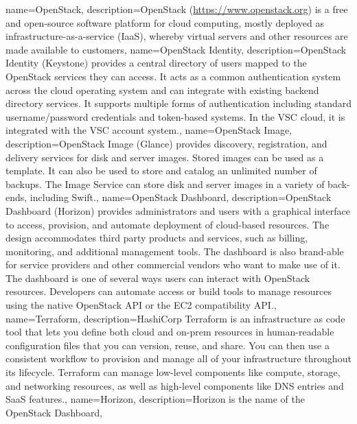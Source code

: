 { name={OpenStack},
  description={OpenStack (\url{https://www.openstack.org}) is a free
    and open-source software platform for cloud computing, mostly
    deployed as infrastructure-as-a-service (IaaS), whereby virtual
    servers and other resources are made available to customers}, }
{ name={OpenStack Identity},
  description={OpenStack Identity (Keystone) provides a central
    directory of users mapped to the OpenStack services they can
    access. It acts as a common authentication system across the cloud
    operating system and can integrate with existing backend directory
    services. It supports multiple forms of authentication including
    standard username/password credentials and token-based systems.
    In the VSC cloud, it is integrated with the VSC account system.},
}
{
  name={OpenStack Image},
  description={OpenStack Image (Glance) provides discovery,
  registration, and delivery services for disk and server images. Stored
  images can be used as a template. It can also be used to store and
  catalog an unlimited number of backups. The Image Service can store
  disk and server images in a variety of back-ends, including Swift.},
}
{
  name={OpenStack Dashboard},
  description={OpenStack Dashboard (Horizon) provides administrators and
  users with a graphical interface to access, provision, and automate
  deployment of cloud-based resources. The design accommodates third
  party products and services, such as billing, monitoring, and
  additional management tools. The dashboard is also brand-able for
  service providers and other commercial vendors who want to make use of
  it. The dashboard is one of several ways users can interact with
  OpenStack resources. Developers can automate access or build tools to
  manage resources using the native OpenStack API or the EC2
  compatibility API.},
}
{
  name={Terraform},
  description={HashiCorp Terraform is an infrastructure as code tool that
  lets you define both cloud and on-prem resources in human-readable
  configuration files that you can version, reuse, and share. You can then
  use a consistent workflow to provision and manage all of your infrastructure
  throughout its lifecycle. Terraform can manage low-level components like
  compute, storage, and networking resources, as well as high-level components
  like DNS entries and SaaS features.},
}
{
  name={Horizon},
  description={Horizon is the name of the \gls{OpenStack Dashboard}},
}

